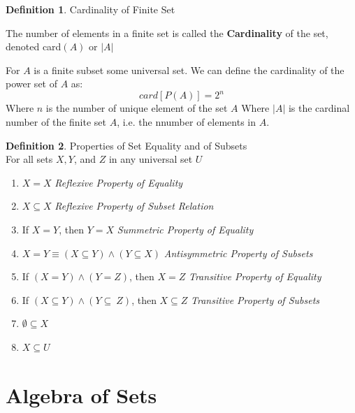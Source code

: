 \documentclass{book}
\theoremstyle{definition}
\newtheorem{definition}{Definition}[section]
\theoremstyle{remark}
\begin{document}
\begin{definition}
Cardinality of Finite Set \\

    \begin{tcolorbox}
        The number of elements in a finite set is called the \textbf{Cardinality} of the set, denoted card$(A)$ or $|A|$
    \end{tcolorbox}
    For $A$ is a finite subset some universal set. We can define the cardinality of the power set of $A$ as: 
        \begin{equation*}
            card[P(A)] = 2^n
        \end{equation*}
        Where $n$ is the number of unique element of the set $A$
    Where $|A|$ is the cardinal number of the finite set $A$, i.e. the nnumber of elements in $A$.
\end{definition}


\begin{definition}
Properties of Set Equality and of Subsets \\

    For all sets $X, Y$, and $Z$ in any universal set $U$ \\
    
    \begin{enumerate}
        \item $X=X$ \textit{Reflexive Property of Equality}
        \item $X \subseteq X$ \textit{Reflexive Property of Subset Relation}
        \item If $X=Y$, then $Y=X$ \textit{Summetric Property of Equality} 
        \item $X=Y \equiv (X \subseteq Y) \wedge (Y \subseteq X)$ \textit{Antisymmetric Property of Subsets}
        \item If $(X=Y) \wedge (Y=Z)$, then $X=Z$ \textit{Transitive Property of Equality} 
        \item If $(X \subseteq Y) \wedge (Y \subseteq\ Z)$, then $X \subseteq Z$ \textit{Transitive Property of Subsets} 
        \item $\emptyset \subseteq X$
        \item $X \subseteq U$  
    \end{enumerate}
\end{definition}





\newpage
\section{Algebra of Sets}
\end{document}
